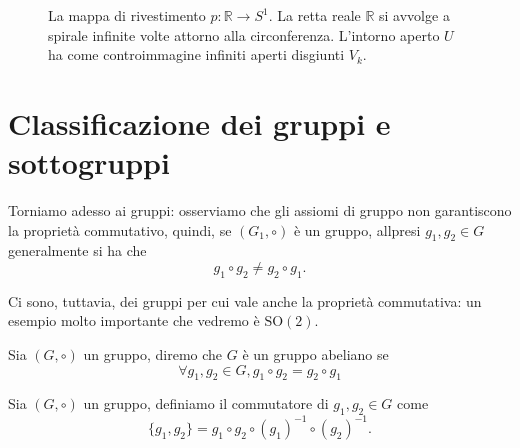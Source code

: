 \begin{figure}[htbp]
    \caption{La mappa di rivestimento $p: \mathbb{R} \to S^1$. La retta reale $\mathbb{R}$ si avvolge a spirale infinite volte attorno alla circonferenza. L'intorno aperto $U$ ha come controimmagine infiniti aperti disgiunti $V_k$.}
\end{figure}

\section{Classificazione dei gruppi e sottogruppi}

Torniamo adesso ai gruppi: osserviamo che gli assiomi di gruppo non garantiscono la proprietà commutativo, quindi, se $(G_1, \circ)$ è un gruppo, allpresi $g_1, g_2 \in G$ generalmente si ha che
\begin{equation}
	g_1 \circ g_2 \neq g_2 \circ g_1.
\end{equation}

Ci sono, tuttavia, dei gruppi per cui vale anche la proprietà commutativa: un esempio molto importante che vedremo è $\text{SO}(2)$.
\begin{definition}
	Sia $(G, \circ)$ un gruppo, diremo che $G$ è un gruppo abeliano se
	\begin{equation}
		\forall g_1, g_2 \in G, g_1 \circ g_2 = g_2 \circ g_1
	\end{equation}
\end{definition}

\begin{definition}[commutatore]
	Sia $(G, \circ)$ un gruppo, definiamo il commutatore di $g_1, g_2 \in G$ come
	\begin{equation}
		\{ g_1, g_2 \} = g_1 \circ g_2 \circ (g_1)^{-1} \circ (g_2)^{-1}.
	\end{equation}
\end{definition}

